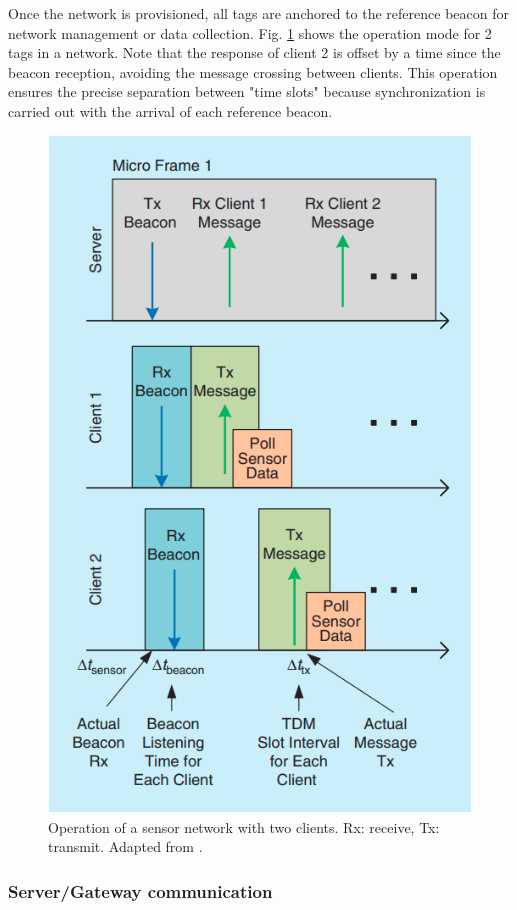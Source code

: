 \documentclass[journal]{IEEEtran}	%
\begin{document}
Once the network is provisioned, all tags are anchored to the reference beacon for network management or data collection. Fig. \ref{fig:beacons} shows the operation mode for 2 tags in a network. Note that the response of client 2 is offset by a time since the beacon reception, avoiding the message crossing between clients. This operation ensures the precise separation between "time slots" because synchronization is carried out with the arrival of each reference beacon.

\begin{figure}[t!]
\centering
\includegraphics[width=0.8\columnwidth]{fig9.png}
\caption{Operation of a sensor network with two clients. Rx: receive, Tx: transmit. Adapted from \cite{williams2017weaving}.}
\label{fig:beacons}
\end{figure}


\subsubsection{Server/Gateway communication}
\end{document}

